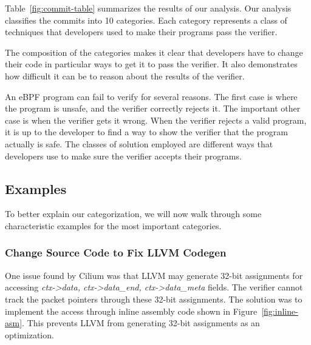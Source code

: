 Table~\ref{fig:commit-table} summarizes the results of our analysis.
Our analysis classifies the commits into 10 categories.
Each category represents a class of techniques that developers used to make their programs pass the verifier.


The composition of the categories makes it clear that developers have to change their code in particular ways to get it to pass the verifier.
It also demonstrates how difficult it can be to reason about the results of the verifier.

An eBPF program can fail to verify for several reasons.
The first case is where the program is unsafe, and the verifier correctly rejects it.
The important other case is when the verifier gets it wrong.
When the verifier rejects a valid program, it is up to the developer to find a way to show the verifier that the program actually is safe.
The classes of solution employed are different ways that developers use to make sure the verifier accepts their programs.

\subsection{Examples}
To better explain our categorization, we will now walk through some characteristic examples for the most important categories.

\subsubsection{Change Source Code to Fix LLVM Codegen}
One issue found by Cilium was that LLVM may generate 32-bit assignments for accessing \emph{ctx->data, ctx->data\_end, ctx->data\_meta} fields.
The verifier cannot track the packet pointers through these 32-bit assignments.
The solution was to implement the access through inline assembly code shown in Figure~\ref{fig:inline-asm}.
This prevents LLVM from generating 32-bit assignments as an optimization.



